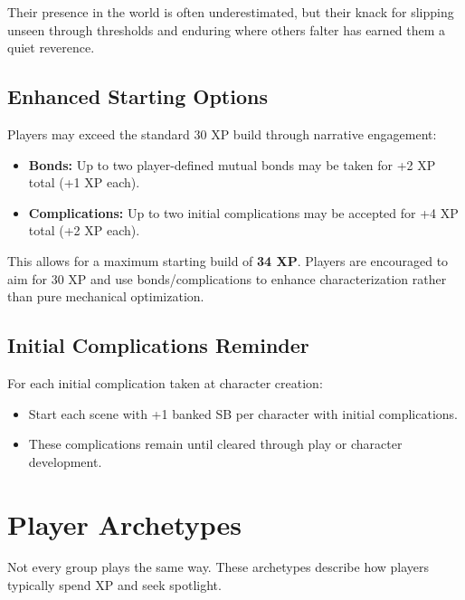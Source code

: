 Their presence in the world is often underestimated, but their knack for slipping unseen through thresholds and enduring where others falter has earned them a quiet reverence.

\subsection{Enhanced Starting Options}
\label{subsec:enhanced-starting}

Players may exceed the standard 30 XP build through narrative engagement:
\begin{itemize}
\item \textbf{Bonds:} Up to two player-defined mutual bonds may be taken for +2 XP total (+1 XP each).
\item \textbf{Complications:} Up to two initial complications may be accepted for +4 XP total (+2 XP each).
\end{itemize}

This allows for a maximum starting build of \textbf{34 XP}. Players are encouraged to aim for 30 XP and use bonds/complications to enhance characterization rather than pure mechanical optimization. 

\subsection{Initial Complications Reminder}
\label{subsec:initial-complications}

For each initial complication taken at character creation:
\begin{itemize}
\item Start each scene with +1 banked SB per character with initial complications.
\item These complications remain until cleared through play or character development.
\end{itemize}

\section{Player Archetypes}
\label{sec:player-archetypes}

Not every group plays the same way. These archetypes describe how players typically spend XP and seek spotlight.

